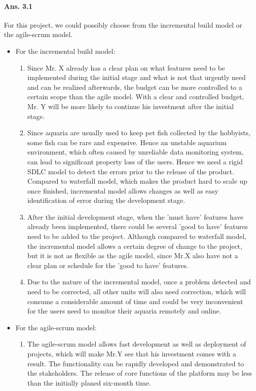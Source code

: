 \documentclass[paper=a4, fontsize=11pt]{scrartcl} %
\numberwithin{equation}{section} %
\numberwithin{figure}{section} %
\numberwithin{table}{section} %
\begin{document}
\paragraph{Ans. 3.1}For this project, we could possibly choose from the incremental build model or the agile-scrum model.
\begin{itemize}
	\item For the incremental build model:
	\begin{enumerate}
		\item Since Mr. X already has a clear plan on what features need to be implemented during the initial stage and what is not that urgently need and can be realized afterwards\cite{case}, the budget can be more controlled to a certain scope than the agile model. With a clear and controlled budget, Mr. Y will be more likely to continue his investment after the initial stage.
		\item Since aquaria are usually used to keep pet fish collected by the hobbyists, some fish can be rare and expensive\cite{aquawiki}. Hence an unstable aquarium environment, which often caused by unreliable data monitoring system, can lead to significant property loss  of the users. Hence we need a rigid SDLC model to detect the errors prior to the release of the product. Compared to waterfall model, which makes the product hard to scale up once finished, incremental model allows changes as well as easy identification of error during the development stage.
		\item After the initial development stage, when the 'must have' features have already been implemented, there could be several 'good to have' features need to be added to the project. Although compared to waterfall model, the incremental model allows a certain degree of change to the project, but it is not as flexible as the agile model, since Mr.X also have not a clear plan or schedule for the 'good to have' features. 
		\item Due to the nature of the incremental model, once a problem detected and need to be corrected, all other units will also need correction, which will consume a considerable amount of time\cite{incremodel} and could be very inconvenient for the users need to monitor their aquaria remotely and online.
	\end{enumerate}
	\item For the agile-scrum model:
	\begin{enumerate}
		\item The agile-scrum model allows fast development as well as deployment of projects, which will make Mr.Y see that his investment comes with a result. The functionality can be rapidly developed and demonstrated to the stakeholders. The release of core functions of the platform may be less than the initially planed six-month time. 

\end{enumerate}
\end{itemize}
\end{document}
